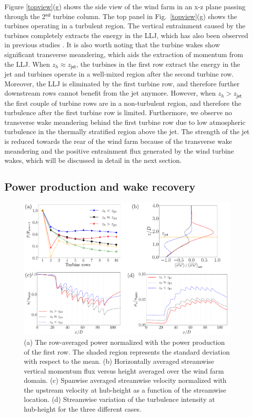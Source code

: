 \documentclass[%
 aip,
 amsmath,amssymb,
preprint,%
author-numerical,%
]{revtex4-1}
\begin{document}
Figure \ref{topview}(g) shows the side view of the wind farm in an x-z plane passing through the 2$^\mathsf{nd}$ turbine column. The top panel in Fig.\ \ref{topview}(g) shows the turbines operating in a turbulent region. The vertical entrainment caused by the turbines completely extracts the energy in the LLJ, which has also been observed in previous studies \cite{na18, lu11}. It is also worth noting that the turbine wakes show significant transverse meandering, which aids the extraction of momentum from the LLJ. When $z_h \approx z_\mathsf{jet}$, the turbines in the first row extract the energy in the jet and turbines operate in a well-mixed region after the second turbine row. Moreover, the LLJ is eliminated by the first turbine row, and therefore further downstream rows cannot benefit from the jet anymore. However, when $z_h > z_\mathsf{jet}$ the first couple of turbine rows are in a non-turbulent region, and therefore the turbulence after the first turbine row is limited. Furthermore, we observe no transverse wake meandering behind the first turbine row due to low atmospheric turbulence in the thermally stratified region above the jet. The strength of the jet is reduced towards the rear of the wind farm because of the transverse wake meandering and the positive entrainment flux generated by the wind turbine wakes, which will be discussed in detail in the next section.

\subsection{Power production and wake recovery}\label{sec3.2}
\begin{figure}
 \centering
 \includegraphics[width=0.9\linewidth]{powerplot_jrse} 
 \vspace{-0.25cm}
 \caption{(a) The row-averaged power normalized with the power production of the first row. The shaded region represents the standard deviation with respect to the mean. (b) Horizontally averaged streamwise vertical momentum flux versus height averaged over the wind farm domain. (c) Spanwise averaged streamwise velocity normalized with the upstream velocity at hub-height as a function of the streamwise location. (d) Streamwise variation of the turbulence intensity at hub-height for the three different cases.}
 \label{powerplots}
\end{figure}
\end{document}
